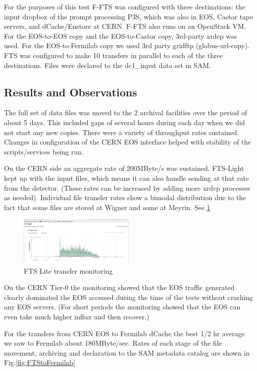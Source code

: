 \documentclass[pdftex,12pt,letter]{article}
\begin{document}
For the purposes of this test F-FTS was configured with three destinations:  the input dropbox of the prompt processing P3S, which was also in EOS, Castor tape servers, and dCache/Enstore at CERN.  F-FTS also runs on an OpenStack VM.
For the EOS-to-EOS copy and the EOS-to-Castor copy, 3rd-party xrdcp was used.  For the EOS-to-Fermilab copy we used 3rd party gridftp (globus-url-copy).
FTS was configured to make 10 transfers in parallel to each of the three destinations. Files were declared to the dc1\_input data set in SAM.



\subsection{Results and Observations}
The full set of data files was moved to the 2 archival facilities over the period of about 5 days.  This included gaps of several hours during each day when we did not start any new copies. There were a variety of throughput rates sustained. Changes in configuration of the CERN EOS interface helped with stability of the scripts/services being run. 

On the CERN side an aggregate rate of 200MByte/s was sustained. FTS-Light kept up with the input files, which means it can also handle sending at that rate from the detector. (These rates can be increased by adding more xrdcp processes as needed). Individual file transfer rates show a bimodal distribution due to the fact that some files are stored at Wigner and some at Meyrin.  See \ref{fig:FTSLite}


\begin{figure}[tbh]
  \centering
  \includegraphics[width=0.5\textwidth]{./ReportImages/FTSLite.jpg}
  \caption{FTS Lite transfer monitoring}
  \label{fig:FTSLite}
\end{figure}


On the CERN Tier-0 the monitoring showed that the EOS traffic generated clearly dominated the EOS accessed during the time of the tests without crashing any EOS servers. (For short periods the monitoring showed that the EOS can even take much higher influx and then recover.)

For the transfers from CERN EOS to Fermilab dCache the best 1/2 hr average we saw to Fermilab about 180MByte/sec. Rates of each stage of the file movement, archiving and declaration to the SAM metadata catalog are shown in  Fig.\ref{fig:FTStoFermilab}
\end{document}
